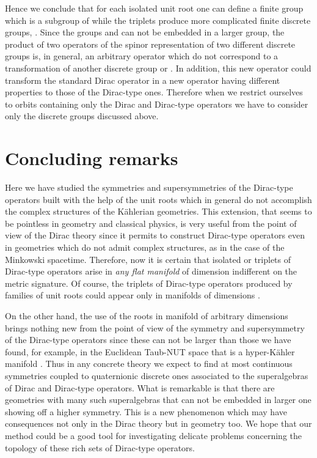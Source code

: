 \documentclass[a4paper,12pt]{article}
\begin{document}
Hence we conclude that for each isolated unit root \coordHE{} one can define a finite 
group \coordHE{} which is a subgroup of \coordHE{} while the triplets 
\coordHE{} produce  more complicated finite discrete groups, \coordHE{}. Since the groups \coordHE{} and \coordHE{} can not be embedded 
in a larger group, the product of two operators of the spinor representation 
of two different discrete groups is, in general, an arbitrary operator which
do not correspond to a transformation of another discrete group \coordHE{} 
or \coordHE{}. In addition, this new operator could transform the standard 
Dirac operator in a new operator having  different properties to those of the 
Dirac-type ones. Therefore when we restrict ourselves to orbits containing 
only the Dirac  and Dirac-type operators we have to consider only the discrete 
groups discussed above.   
 
\section{Concluding remarks}

Here we have studied the symmetries and  supersymmetries of the 
Dirac-type operators built with the help of the unit roots which in
general do not accomplish the complex structures of the K\" ahlerian geometries. 
This extension, that seems to be pointless in geometry and 
classical physics, is very useful from the point of view of the Dirac theory 
since it permits to construct Dirac-type operators even in geometries which do 
not admit complex structures, as in the case of the 
Minkowski spacetime. Therefore, now it is certain that isolated  
or triplets of Dirac-type operators arise in {\em any flat manifold} 
of dimension \coordHE{} indifferent on the metric signature.    
Of course,  the triplets of Dirac-type operators produced by families of unit 
roots could appear only in  manifolds of dimensions \coordHE{}.
 
On the other hand, the use of the roots in manifold of arbitrary dimensions 
brings nothing new from the point of view of the symmetry and 
supersymmetry of the Dirac-type operators since these can not be larger than 
those we have found, for example, in the Euclidean Taub-NUT space that is a 
hyper-K\" ahler manifold \cite{CV,CV1}. Thus in any concrete theory we expect 
to find at most continuous \coordHE{} symmetries coupled to quaternionic discrete 
ones  associated to the \coordHE{} superalgebras of Dirac and Dirac-type operators. 
What is remarkable is that there are geometries with many such superalgebras 
that can not be embedded in larger one showing off a higher symmetry. This 
is a new phenomenon which may have consequences not only in the Dirac theory 
but in geometry too. We hope that our method could be a good tool for 
investigating delicate problems concerning the topology of these rich sets of 
Dirac-type operators. 
\end{document}
